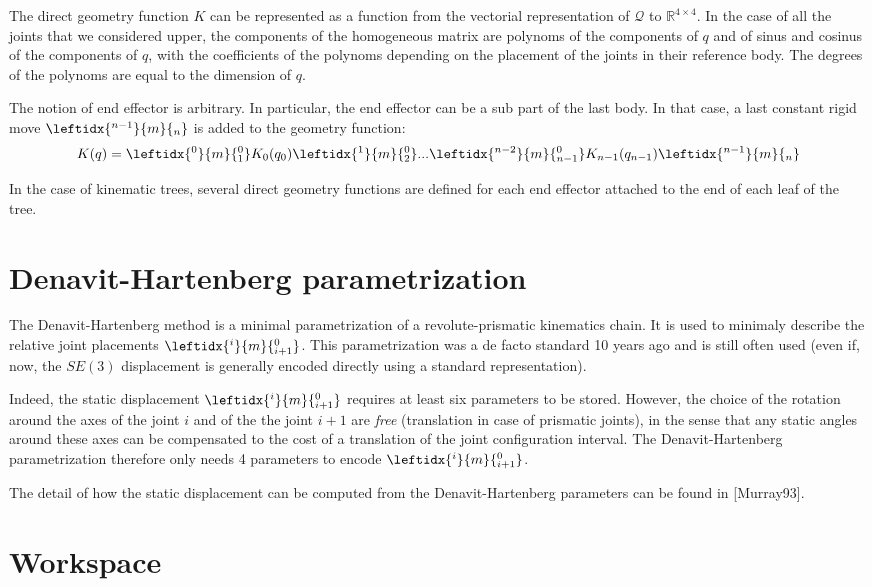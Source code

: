 \documentclass{book}
\begin{document}
The direct geometry function $K$ can be represented as a function from the vectorial representation of $\mathcal{Q}$ to $\mathbb{R}^{4\times4}$.
In the case of all the joints that we considered upper, the components of the homogeneous matrix are polynoms of the components of $q$ and of sinus and cosinus of the components of $q$, with the coefficients of the polynoms depending on the placement of the joints in their reference body. The degrees of the polynoms are equal to the dimension of $q$.

The notion of end effector is arbitrary. In particular, the end effector can be a sub part of the last body. In that case, a last constant rigid move $\leftidx{^{n-1}}{m}{_n}$ is added to the geometry function:
\[ K(q) =  \leftidx{^0}{m}{_{1}^0} K_0(q_0) \leftidx{^1}{m}{_{2}^0} ...   \leftidx{^{n-2}}{m}{_{n-1}^0} K_{n-1}(q_{n-1}) \leftidx{^{n-1}}{m}{_n} \]

In the case of kinematic trees, several direct geometry functions are defined for each end effector attached to the end of each leaf of the tree.

\section{Denavit-Hartenberg parametrization}

The Denavit-Hartenberg method is a minimal parametrization of a revolute-prismatic kinematics chain. It is used to minimaly describe the relative joint placements $\leftidx{^{i}}{m}{_{i+1}^0}$. This parametrization was a de facto standard 10 years ago and is still often used (even if, now, the $SE(3)$ displacement is generally encoded directly using a standard representation).

Indeed, the static displacement $\leftidx{^{i}}{m}{_{i+1}^0}$ requires at least six parameters to be stored. However, the choice of the rotation around the axes of the joint $i$ and of the the joint $i+1$ are \emph{free} (translation in case of prismatic joints), in the sense that any static angles around these axes can be compensated to the cost of a translation of the joint configuration interval. The Denavit-Hartenberg parametrization therefore only needs 4 parameters to encode $\leftidx{^{i}}{m}{_{i+1}^0}$. 

The detail of how the static displacement can be computed from the Denavit-Hartenberg parameters can be found in [Murray93].

\section{Workspace}
\end{document}
